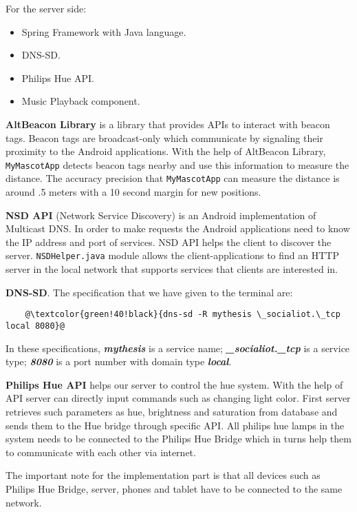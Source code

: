 For the server side:
\begin{itemize}
    \item Spring Framework with Java language.
    \item DNS-SD\@.
    \item Philips Hue API\@.
    \item Music Playback component.
\end{itemize}

\textbf{AltBeacon Library} is a library that provides APIs to interact with beacon tags.
Beacon tags are broadcast-only which communicate by signaling their proximity to the Android applications.
With the help of AltBeacon Library, \texttt{MyMascotApp} detects beacon tags nearby
and use this information to measure the distance.
The accuracy precision that \texttt{MyMascotApp} can measure the distance is around .5 meters
with a 10 second margin for new positions.

\textbf{NSD API} (Network Service Discovery) is an Android implementation of Multicast DNS\@.
In order to make requests the Android applications need to know the IP address and port of services.
NSD API helps the client to discover the server.
\texttt{NSDHelper.java} module allows the client-applications to find an HTTP server in the local network that supports
services that clients are interested in.

\textbf{DNS-SD}.
The specification that we have given to the terminal are:
\begin{lstlisting}
    @\textcolor{green!40!black}{dns-sd -R mythesis \_socialiot.\_tcp local 8080}@
\end{lstlisting}

In these specifications, \textbf{\emph{mythesis}} is a service name;
\textbf{\emph{\_socialiot.\_tcp}} is a service type;
\textbf{\emph{8080}} is a port number with domain type \textbf{\emph{local}}.

\textbf{Philips Hue API} helps our server to control the hue system.
With the help of API server can directly input commands such as changing light color.
First server retrieves such parameters as hue, brightness and saturation from database and sends them
to the Hue bridge through specific API\@.
All philips hue lamps in the system needs to be connected to the Philips Hue Bridge which in turns help them
to communicate with each other via internet.

The important note for the implementation part is that all devices such as Philips Hue Bridge, server, phones and tablet
have to be connected to the same network.


